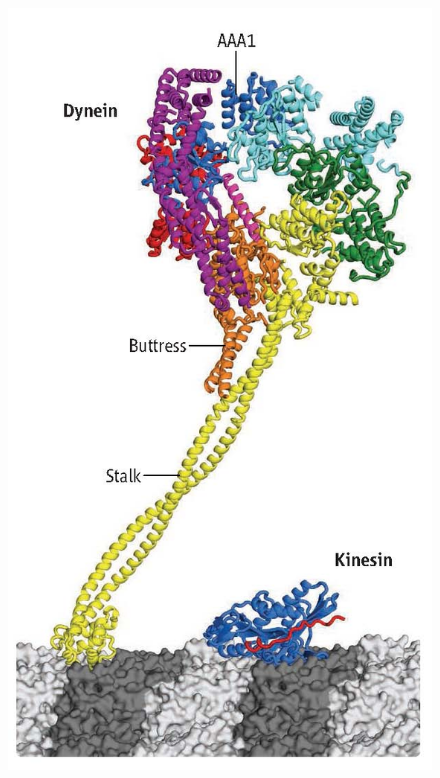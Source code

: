\documentclass[
11pt, %
english, %
singlespacing, %
headsepline, %
chapterinoneline, %
]{MastersDoctoralThesis} %
\begin{document}
\begin{figure}[H]
  \centering
  \begin{minipage}{0.3\textwidth}
    \includegraphics[width=\textwidth,keepaspectratio]{../figures/kinesin_vs_dynein}
  \end{minipage}
  \begin{minipage}{0.65\textwidth}

\end{minipage}
\end{figure}
\end{document}
